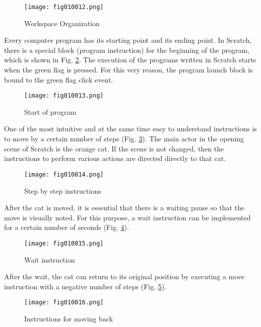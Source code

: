 \begin{figure}[H]
   \centering
   \texttt{[image: fig010012.png]}
   \caption{Workspace Organization}
\label{fig010012}
\end{figure}

Every computer program has its starting point and its ending point. In Scratch, there is a special block (program instruction) for the beginning of the program, which is shown in Fig. \ref{fig010013}. The execution of the programs written in Scratch starts when the green flag is pressed. For this very reason, the program launch block is bound to the green flag click event.

\begin{figure}[H]
   \centering
   \texttt{[image: fig010013.png]}
   \caption{Start of program}
\label{fig010013}
\end{figure}

One of the most intuitive and at the same time easy to understand instructions is to move by a certain number of steps (Fig. \ref{fig010014}). The main actor in the opening scene of Scratch is the orange cat. If the scene is not changed, then the instructions to perform various actions are directed directly to that cat.

\begin{figure}[H]
   \centering
   \texttt{[image: fig010014.png]}
   \caption{Step by step instructions}
\label{fig010014}
\end{figure}

After the cat is moved, it is essential that there is a waiting pause so that the move is visually noted. For this purpose, a wait instruction can be implemented for a certain number of seconds (Fig. \ref{fig010015}).

\begin{figure}[H]
   \centering
   \texttt{[image: fig010015.png]}
   \caption{Wait instruction}
\label{fig010015}
\end{figure}

After the wait, the cat can return to its original position by executing a move instruction with a negative number of steps (Fig. \ref{fig010016}).

\begin{figure}[H]
   \centering
   \texttt{[image: fig010016.png]}
   \caption{Instructions for moving back}
\label{fig010016}
\end{figure}

